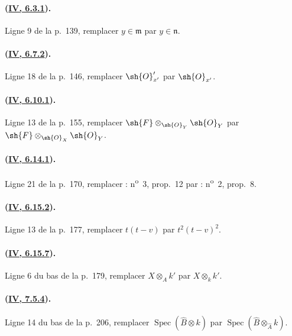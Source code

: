 \paragraph{({\texorpdfstring{\protect\hyperref[canon-index.ega4.c04.prop.6-3-1]{IV, 6.3.1}}{IV, 6.3.1}}).}
Ligne 9 de la p.~139, remplacer $y\in\mathfrak m$ par
$y\in\mathfrak n$.

\paragraph{({\texorpdfstring{\protect\hyperref[canon-index.ega4.c04.cor.6-7-2]{IV, 6.7.2}}{IV, 6.7.2}}).}
Ligne 18 de la p.~146, remplacer $\sh{O}'_{x'}$ par $\sh{O}_{x'}$.

\paragraph{({\texorpdfstring{\protect\hyperref[canon-index.ega4.c04.statement.6-10-1]{IV, 6.10.1}}{IV, 6.10.1}}).}
Ligne 13 de la p.~155, remplacer
$\sh{F}\otimes_{\sh{O}_Y}\sh{O}_Y$ par
$\sh{F}\otimes_{\sh{O}_X}\sh{O}_Y$.

\paragraph{({\texorpdfstring{\protect\hyperref[canon-index.ega4.c04.prop.6-14-1]{IV, 6.14.1}}{IV, 6.14.1}}).}
Ligne 21 de la p.~170, remplacer : n\textsuperscript{o}~3, prop.~12
par : n\textsuperscript{o}~2, prop.~8.

\paragraph{({\texorpdfstring{\protect\hyperref[canon-index.ega4.c04.statement.6-15-2]{IV, 6.15.2}}{IV, 6.15.2}}).}
Ligne 13 de la p.~177, remplacer $t(t-v)$ par $t^2(t-v)^2$.

\paragraph{({\texorpdfstring{\protect\hyperref[canon-index.ega4.c04.prop.6-15-7]{IV, 6.15.7}}{IV, 6.15.7}}).}
Ligne 6 du bas de la p.~179, remplacer $X\otimes_Ak'$ par
$X\otimes_kk'$.

\paragraph{({\texorpdfstring{\protect\hyperref[canon-index.ega4.c04.item.7-5-4]{IV, 7.5.4}}{IV, 7.5.4}}).}
Ligne 14 du bas de la p.~206, remplacer
$\operatorname{Spec}(\widehat B\otimes k)$ par
$\operatorname{Spec}(\widehat B\otimes_{\widehat A}k)$.

